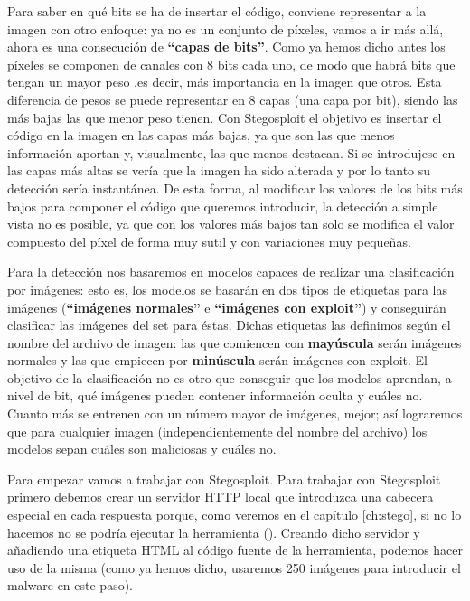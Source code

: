 Para saber en qué bits se ha de insertar el código, conviene representar a la imagen con otro enfoque: ya no es un conjunto de píxeles, vamos a ir más allá, ahora es una consecución de \textbf{``capas de bits''}. Como ya hemos dicho antes los píxeles se componen de canales con 8 bits cada uno, de modo que habrá bits que tengan un mayor peso ,es decir, más importancia en la imagen que otros. Esta diferencia de pesos se puede representar en 8 capas (una capa por bit), siendo las más bajas las que menor peso tienen. Con Stegosploit el objetivo es insertar el código en la imagen en las capas más bajas, ya que son las que menos información aportan y, visualmente, las que menos destacan. Si se introdujese en las capas más altas se vería que la imagen ha sido alterada y por lo tanto su detección sería instantánea. De esta forma, al modificar los valores de los bits más bajos para componer el código que queremos introducir, la detección a simple vista no es posible, ya que con los valores más bajos tan solo se modifica el valor compuesto del píxel de forma muy sutil y con variaciones muy pequeñas.

Para la detección nos basaremos en modelos capaces de realizar una clasificación por imágenes: esto es, los modelos se basarán en dos tipos de etiquetas para las imágenes (\textbf{``imágenes normales''} e \textbf{``imágenes con exploit''}) y conseguirán clasificar las imágenes del set para éstas. Dichas etiquetas las definimos según el nombre del archivo de imagen: las que comiencen con \textbf{mayúscula} serán imágenes normales y las que empiecen por \textbf{minúscula} serán imágenes con exploit. El objetivo de la clasificación no es otro que conseguir que los modelos aprendan, a nivel de bit, qué imágenes pueden contener información oculta y cuáles no. Cuanto más se entrenen con un número mayor de imágenes, mejor; así lograremos que para cualquier imagen (independientemente del nombre del archivo) los modelos sepan cuáles son maliciosas y cuáles no.

Para empezar vamos a trabajar con Stegosploit. Para trabajar con Stegosploit primero debemos crear un servidor HTTP local que introduzca una cabecera especial en cada respuesta porque, como veremos en el capítulo \ref{ch:stego}, si no lo hacemos no se podría ejecutar la herramienta (\cite{server-http}). Creando dicho servidor y añadiendo una etiqueta HTML al código fuente de la herramienta, podemos hacer uso de la misma (como ya hemos dicho, usaremos 250 imágenes para introducir el malware en este paso).

